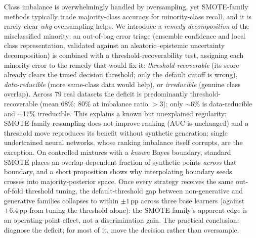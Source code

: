 Class imbalance is overwhelmingly handled by oversampling, yet SMOTE-family methods
typically trade majority-class accuracy for minority-class recall, and it is rarely
clear \emph{why} oversampling helps. We introduce a \emph{remedy decomposition} of
the misclassified minority: an out-of-bag error triage (ensemble confidence and
local class representation, validated against an aleatoric--epistemic uncertainty
decomposition) is combined with a threshold-recoverability test, assigning each
minority error to the remedy that would fix it: \emph{threshold-recoverable} (its
score already clears the tuned decision threshold; only the default cutoff is
wrong), \emph{data-reducible} (more same-class data would help), or
\emph{irreducible} (genuine class overlap). Across 79 real datasets the deficit is
predominantly threshold-recoverable (mean $68\%$; $80\%$ at imbalance ratio $>3$);
only $\sim$6\% is data-reducible and $\sim$17\% irreducible. This explains a known
but unexplained regularity: SMOTE-family resampling does not improve ranking (AUC
is unchanged) and a threshold move reproduces its benefit without synthetic
generation; single undertrained neural networks, whose ranking imbalance itself
corrupts, are the exception. On controlled mixtures with a
\emph{known} Bayes boundary, standard SMOTE places an overlap-dependent fraction of
synthetic points \emph{across} that boundary, and a short proposition shows why
interpolating boundary seeds crosses into majority-posterior space. Once every strategy receives
the same out-of-fold threshold tuning, the default-threshold gap between
non-generative and generative families collapses to within $\pm1$\,pp across three
base learners (against $+6.4$\,pp from tuning the threshold alone): the SMOTE
family's apparent edge is an operating-point effect, not a discrimination gain. The
practical conclusion: diagnose the deficit; for most of it, move the decision
rather than oversample.
